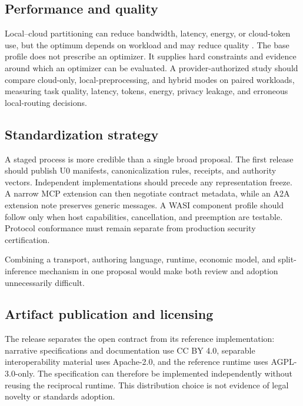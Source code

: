 \subsection{Performance and quality}
Local--cloud partitioning can reduce bandwidth, latency, energy, or cloud-token use, but the optimum depends on workload and may reduce quality \cite{Kang2017,Li2018,Matsubara2022,LocalSplitter2026}. The base profile does not prescribe an optimizer. It supplies hard constraints and evidence around which an optimizer can be evaluated. A provider-authorized study should compare cloud-only, local-preprocessing, and hybrid modes on paired workloads, measuring task quality, latency, tokens, energy, privacy leakage, and erroneous local-routing decisions.

\subsection{Standardization strategy}
A staged process is more credible than a single broad proposal. The first release should publish U0 manifests, canonicalization rules, receipts, and authority vectors. Independent implementations should precede any representation freeze. A narrow MCP extension can then negotiate contract metadata, while an A2A extension note preserves generic messages. A WASI component profile should follow only when host capabilities, cancellation, and preemption are testable. Protocol conformance must remain separate from production security certification.

Combining a transport, authoring language, runtime, economic model, and split-inference mechanism in one proposal would make both review and adoption unnecessarily difficult.

\subsection{Artifact publication and licensing}
The release separates the open contract from its reference implementation: narrative specifications and documentation use CC BY 4.0, separable interoperability material uses Apache-2.0, and the reference runtime uses AGPL-3.0-only. The specification can therefore be implemented independently without reusing the reciprocal runtime. This distribution choice is not evidence of legal novelty or standards adoption.

